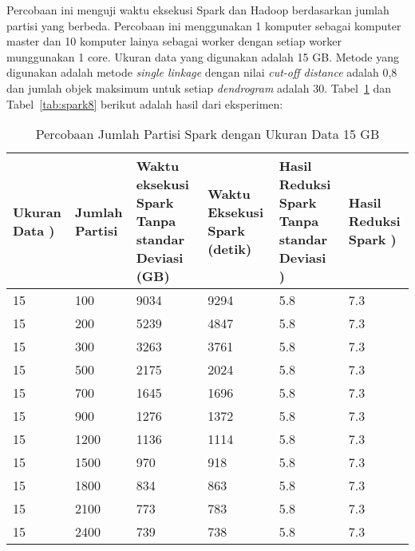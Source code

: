 

Percobaan ini menguji waktu eksekusi Spark dan Hadoop berdasarkan jumlah partisi yang berbeda. Percobaan ini menggunakan 1 komputer sebagai komputer master dan 10 komputer lainya sebagai worker dengan setiap worker munggunakan 1 core. Ukuran data yang digunakan adalah 15 GB. Metode yang digunakan adalah metode \textit{single linkage} dengan nilai \textit{cut-off distance} adalah 0,8 dan jumlah objek maksimum untuk setiap \textit{dendrogram} adalah 30. Tabel~\ref{tab:spark7} dan Tabel~\ref{tab:spark8} berikut adalah hasil dari eksperimen:

\begin{table}[H] 
	\centering 
	\caption{Percobaan Jumlah Partisi Spark dengan Ukuran Data 15 GB}
	\label{tab:spark7}
	\begin{tabular}{|p{1cm}|p{1cm}|p{3cm}|p{3cm}|p{3cm}|p{3cm}|}
\hline
Ukuran Data ) & Jumlah Partisi &  Waktu eksekusi Spark Tanpa standar Deviasi (GB) & Waktu Eksekusi Spark (detik) & Hasil Reduksi Spark Tanpa standar Deviasi ) & Hasil Reduksi Spark )  \\ 
\hline
15 & 100 & 9034  & 9294  &  5.8 & 7.3 \\
\hline
15 & 200 & 5239  & 4847  & 5.8 & 7.3 \\
\hline
15 & 300 & 3263  & 3761  & 5.8 & 7.3 \\
\hline
15 & 500 & 2175  & 2024  &  5.8 & 7.3 \\
\hline
15 & 700 & 1645  & 1696  & 5.8 & 7.3 \\
\hline
15 & 900 & 1276  & 1372  & 5.8 & 7.3 \\
\hline
15 & 1200 & 1136  & 1114  & 5.8 & 7.3 \\
\hline
15 & 1500 & 970  & 918  & 5.8 & 7.3 \\
\hline
15 & 1800 & 834  & 863  & 5.8 & 7.3 \\
\hline
15 & 2100 & 773  & 783  & 5.8 & 7.3 \\
\hline
15 & 2400 & 739  & 738  & 5.8 & 7.3 \\
\hline

\hline

	\end{tabular} 
\end{table}



